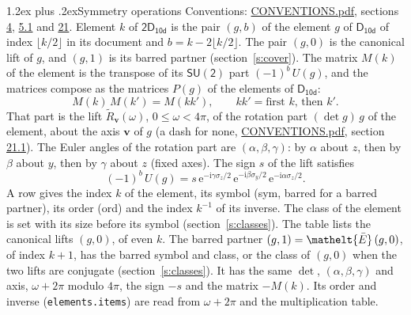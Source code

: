 \documentclass[10pt,a4paper]{article}
\makeatletter
\renewcommand\section{\@startsection{section}{1}{\z@}{-3ex plus -1ex minus -.2ex}%
  {1.2ex plus .2ex}{\normalfont\large\sffamily\bfseries\color{parttitle}}}
\numberwithin{equation}{section}
\newcommand{\eltfont}[1]{{\let\sigma\eltsigma\mathelt{#1}}}
\newcommand{\grp}[1]{\mathsf{#1}}
\newcommand{\elt}[1]{\eltfont{#1}}
\newcommand{\vv}{\mathbf{v}}
\newcommand{\iunit}{\mathrm{i}}
\newcommand{\expe}{\mathrm{e}}
\newcommand{\barred}[1]{\bar{#1}}
\newcommand{\lift}[1]{\tilde{#1}}
\newcommand{\pauli}[1]{\sigma_{#1}}
\makeatother
\begin{document}
\section{Symmetry operations}\label{s:elements}
Conventions: \href{../../CONVENTIONS.pdf}{CONVENTIONS.pdf}, sections \href{../../../rotation/CONVENTIONS.pdf\#conv.4}{4}, \href{../../../rotation/CONVENTIONS.pdf\#conv.5.1}{5.1} and \href{../../CONVENTIONS.pdf\#conv.21}{21}.
\leavevmode\label{n:index.element}\label{n:element.g}Element $k$ of $\grp{2D_{10d}}$ is the pair $(g, b)$ of the element $g$ of \href{../../../rotation/data/pdf/D10d.pdf}{$\grp{D_{10d}}$} of index $\lfloor k/2\rfloor$ in its document and $b = k - 2\lfloor k/2\rfloor$. The pair $(g, 0)$ is the canonical lift of $g$, and $(g, 1)$ is its barred partner (section~\ref{s:cover}). \label{n:matrix.element.pin}\label{n:matrix.element}The matrix $M(k)$ of the element is the transpose of its $\grp{SU(2)}$ part $(-1)^{b}\,U(g)$, and the matrices compose as the matrices $P(g)$ of the elements of $\grp{D_{10d}}$:
\begin{equation}\label{e:mprod}M(k)\,M(k') = M(kk'),\qquad kk' = \text{first } k\text{, then } k'.\end{equation}
\leavevmode\label{n:angle.omega}\label{n:vector.axis}\label{n:vector.pole}That part is the lift $\lift{R}_{\vv}(\omega)$, $0 \le \omega < 4\pi$, of the rotation part $(\det g)\,g$ of the element, about the axis $\vv$ of $g$ (a dash for none, \href{../../CONVENTIONS.pdf}{CONVENTIONS.pdf}, section \href{../../CONVENTIONS.pdf\#conv.21.1}{21.1}). \label{n:angle.euler.alpha}\label{n:angle.euler.beta}\label{n:angle.euler.gamma}\label{n:vector.coordinates}The Euler angles of the rotation part are $(\alpha,\beta,\gamma)$: by $\alpha$ about $z$, then by $\beta$ about $y$, then by $\gamma$ about $z$ (fixed axes). \label{n:local.euler.sign}The sign $s$ of the lift satisfies
\begin{equation}\label{e:euler}(-1)^{b}\,U(g) = s\,\expe^{-\iunit\gamma\pauli{z}/2}\,\expe^{-\iunit\beta\pauli{y}/2}\,\expe^{-\iunit\alpha\pauli{z}/2}.\end{equation}
\leavevmode\label{n:index.element.inverse}\label{n:head.sym}\label{n:head.ord}A row gives the index $k$ of the element, its symbol (sym, barred for a barred partner), its order (ord) and the index $k^{-1}$ of its inverse. \label{n:head.class}The class of the element is set with its size before its symbol (section~\ref{s:classes}).
The table lists the canonical lifts $(g, 0)$, of even $k$. The barred partner $(g, 1) = \elt{\barred{E}}\,(g, 0)$, of index $k + 1$, has the barred symbol and class, or the class of $(g, 0)$ when the two lifts are conjugate (section~\ref{s:classes}). It has the same $\det$, $(\alpha,\beta,\gamma)$ and axis, $\omega + 2\pi$ modulo $4\pi$, the sign $-s$ and the matrix $-M(k)$. Its order and inverse (\texttt{elements.items}) are read from $\omega + 2\pi$ and the multiplication table.
\end{document}
